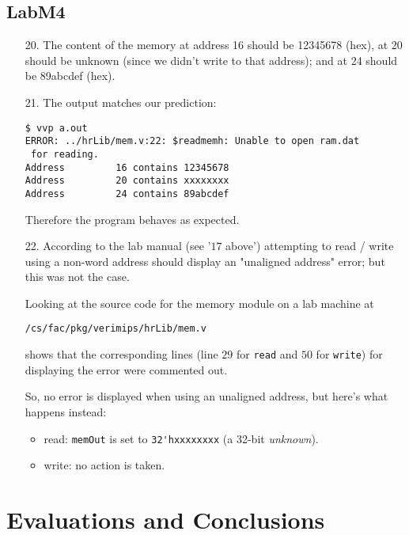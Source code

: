 \documentclass{article}
\begin{document}
\subsection{LabM4}
\begin{enumerate}
\item[20. ] The content of the memory at address 16 should be 12345678 (hex),
at 20 should be unknown (since we didn't write to that address);
and at 24 should be 89abcdef (hex).

\item[21. ] The output matches our prediction:
\begin{verbatim}
$ vvp a.out
ERROR: ../hrLib/mem.v:22: $readmemh: Unable to open ram.dat
 for reading.
Address         16 contains 12345678
Address         20 contains xxxxxxxx
Address         24 contains 89abcdef
\end{verbatim}
  Therefore the program behaves as expected.

\item[22. ] According to the lab manual (see '$17$ above') attempting to
read / write using a non-word address should display an "unaligned address"
error; but this was not the case. \newline

Looking at the source code for the memory module on a lab machine at
\begin{verbatim}
/cs/fac/pkg/verimips/hrLib/mem.v
\end{verbatim}
shows that the corresponding lines (line $29$ for \verb$read$ and
$50$ for \verb$write$) for displaying the error were commented out. \newline

So, no error is displayed when using an unaligned address, but here's what
happens instead:

\begin{itemize}
\item read: \verb$memOut$ is set to \verb$32'hxxxxxxxx$ (a 32-bit \textit{unknown}).
\item write: no action is taken.
\end{itemize}
\end{enumerate}


\section{Evaluations and Conclusions}
\end{document}
